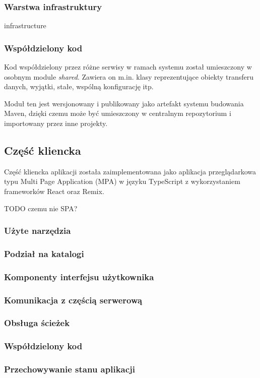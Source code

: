 \subsubsection{Warstwa infrastruktury} infrastructure

\subsubsection{Współdzielony kod}

Kod współdzielony przez różne serwisy w ramach systemu został umieszczony w osobnym module \textit{shared}. Zawiera on m.in. klasy reprezentujące obiekty transferu danych, wyjątki, stałe, wspólną konfigurację itp.

Moduł ten jest wersjonowany i publikowany jako artefakt systemu budowania Maven, dzięki czemu może być umieszczony w centralnym repozytorium i importowany przez inne projekty.

\subsection{Część kliencka}

Część kliencka aplikacji została zaimplementowana jako aplikacja przeglądarkowa typu Multi Page Application (MPA) w języku TypeScript z wykorzystaniem frameworków React oraz Remix.

TODO czemu nie SPA?

\subsubsection{Użyte narzędzia}

\subsubsection{Podział na katalogi}

\subsubsection{Komponenty interfejsu użytkownika}

\subsubsection{Komunikacja z częścią serwerową}

\subsubsection{Obsługa ścieżek}

\subsubsection{Współdzielony kod}

\subsubsection{Przechowywanie stanu aplikacji}
